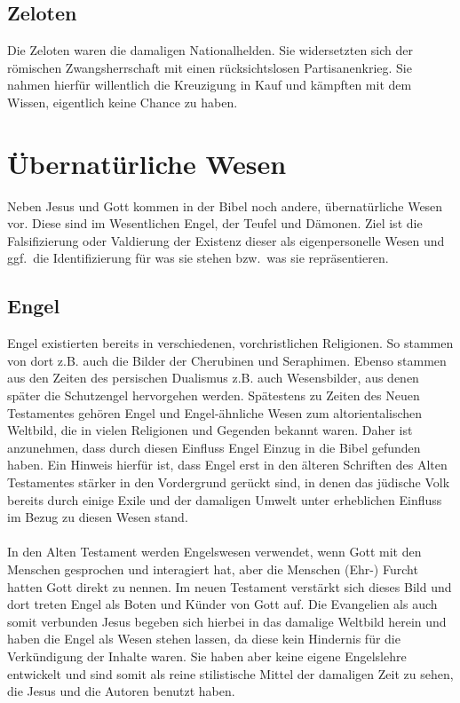 \subsection{Zeloten}
Die Zeloten waren die damaligen Nationalhelden. Sie widersetzten sich der römischen Zwangsherrschaft mit einen rücksichtslosen Partisanenkrieg. Sie nahmen hierfür willentlich die Kreuzigung in Kauf und kämpften mit dem Wissen, eigentlich keine Chance zu haben.

\section{Übernatürliche Wesen}
Neben Jesus und Gott kommen in der Bibel noch andere, übernatürliche Wesen vor. Diese sind im Wesentlichen Engel, der Teufel und Dämonen. Ziel ist die Falsifizierung oder Valdierung der Existenz dieser als eigenpersonelle Wesen und ggf.\ die Identifizierung für was sie stehen bzw.\ was sie repräsentieren.

\subsection{Engel}
Engel existierten bereits in verschiedenen, vorchristlichen Religionen. So stammen von dort z.B. auch die Bilder der Cherubinen und Seraphimen. Ebenso
stammen aus den Zeiten des persischen Dualismus z.B. auch Wesensbilder, aus denen später die Schutzengel hervorgehen werden. Spätestens zu Zeiten des Neuen Testamentes gehören Engel und Engel-ähnliche Wesen zum altorientalischen Weltbild, die in vielen Religionen und Gegenden bekannt waren. Daher ist anzunehmen, dass durch diesen Einfluss Engel Einzug in die Bibel gefunden haben. Ein Hinweis hierfür ist, dass Engel erst in den älteren Schriften des Alten Testamentes stärker in den Vordergrund gerückt sind, in denen das jüdische Volk bereits durch einige Exile und der damaligen Umwelt
unter erheblichen Einfluss im Bezug zu diesen Wesen stand.
\\~\\
In den Alten Testament werden Engelswesen verwendet, wenn Gott mit den Menschen gesprochen und interagiert hat, aber die Menschen (Ehr-) Furcht hatten
Gott direkt zu nennen. Im neuen Testament verstärkt sich dieses Bild und dort treten Engel als Boten und Künder von Gott auf.  Die Evangelien als auch somit
verbunden Jesus begeben sich hierbei in das damalige Weltbild herein und haben die Engel als Wesen stehen lassen, da diese kein Hindernis für die Verkündigung
der Inhalte waren. Sie haben aber keine eigene Engelslehre entwickelt und sind somit als reine stilistische Mittel der damaligen Zeit zu sehen, die Jesus und die Autoren benutzt haben. \\

